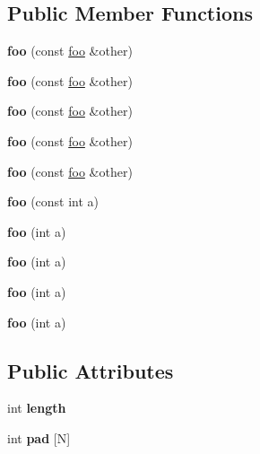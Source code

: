 \subsection*{Public Member Functions}
\begin{DoxyCompactItemize}
\item 
\hypertarget{structfoo_a945e3b4a8527d238289dd9911ebd169a}{}\label{structfoo_a945e3b4a8527d238289dd9911ebd169a} 
{\bfseries foo} (const \hyperlink{structfoo}{foo} \&other)
\item 
\hypertarget{structfoo_a945e3b4a8527d238289dd9911ebd169a}{}\label{structfoo_a945e3b4a8527d238289dd9911ebd169a} 
{\bfseries foo} (const \hyperlink{structfoo}{foo} \&other)
\item 
\hypertarget{structfoo_a945e3b4a8527d238289dd9911ebd169a}{}\label{structfoo_a945e3b4a8527d238289dd9911ebd169a} 
{\bfseries foo} (const \hyperlink{structfoo}{foo} \&other)
\item 
\hypertarget{structfoo_a945e3b4a8527d238289dd9911ebd169a}{}\label{structfoo_a945e3b4a8527d238289dd9911ebd169a} 
{\bfseries foo} (const \hyperlink{structfoo}{foo} \&other)
\item 
\hypertarget{structfoo_a945e3b4a8527d238289dd9911ebd169a}{}\label{structfoo_a945e3b4a8527d238289dd9911ebd169a} 
{\bfseries foo} (const \hyperlink{structfoo}{foo} \&other)
\item 
\hypertarget{structfoo_a4a33261211b2120eb125a5d72231d760}{}\label{structfoo_a4a33261211b2120eb125a5d72231d760} 
{\bfseries foo} (const int a)
\item 
\hypertarget{structfoo_a47b7bf8a1c8c362168fe403303daabdb}{}\label{structfoo_a47b7bf8a1c8c362168fe403303daabdb} 
{\bfseries foo} (int a)
\item 
\hypertarget{structfoo_a47b7bf8a1c8c362168fe403303daabdb}{}\label{structfoo_a47b7bf8a1c8c362168fe403303daabdb} 
{\bfseries foo} (int a)
\item 
\hypertarget{structfoo_a47b7bf8a1c8c362168fe403303daabdb}{}\label{structfoo_a47b7bf8a1c8c362168fe403303daabdb} 
{\bfseries foo} (int a)
\item 
\hypertarget{structfoo_a47b7bf8a1c8c362168fe403303daabdb}{}\label{structfoo_a47b7bf8a1c8c362168fe403303daabdb} 
{\bfseries foo} (int a)
\end{DoxyCompactItemize}
\subsection*{Public Attributes}
\begin{DoxyCompactItemize}
\item 
\hypertarget{structfoo_a2c253fe8675deda213c8706ee9290905}{}\label{structfoo_a2c253fe8675deda213c8706ee9290905} 
int {\bfseries length}
\item 
\hypertarget{structfoo_a898f24e3da43e5d60223494b15b6f53b}{}\label{structfoo_a898f24e3da43e5d60223494b15b6f53b} 
int {\bfseries pad} \mbox{[}N\mbox{]}
\end{DoxyCompactItemize}


